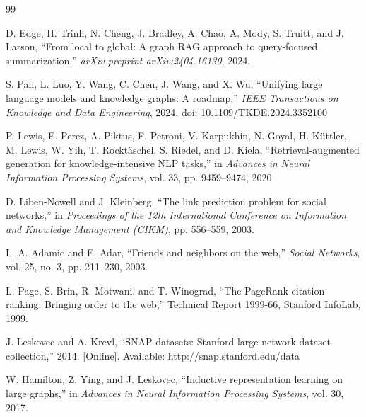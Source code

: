 \documentclass[10pt]{article}
\begin{document}
\newpage
\renewcommand{\refname}{References}

\makeatletter
\renewcommand\@biblabel[1]{}
\makeatother

\begin{thebibliography}{99}

\hangindent=36pt 
D. Edge, H. Trinh, N. Cheng, J. Bradley, A. Chao, A. Mody, S. Truitt, and J. Larson, ``From local to global: A graph RAG approach to query-focused summarization,'' \textit{arXiv preprint arXiv:2404.16130}, 2024.

\hangindent=36pt 
S. Pan, L. Luo, Y. Wang, C. Chen, J. Wang, and X. Wu, ``Unifying large language models and knowledge graphs: A roadmap,'' \textit{IEEE Transactions on Knowledge and Data Engineering}, 2024. doi: 10.1109/TKDE.2024.3352100

\hangindent=36pt 
P. Lewis, E. Perez, A. Piktus, F. Petroni, V. Karpukhin, N. Goyal, H. K\"{u}ttler, M. Lewis, W. Yih, T. Rockt\"{a}schel, S. Riedel, and D. Kiela, ``Retrieval-augmented generation for knowledge-intensive NLP tasks,'' in \textit{Advances in Neural Information Processing Systems}, vol. 33, pp. 9459--9474, 2020.

\hangindent=36pt 
D. Liben-Nowell and J. Kleinberg, ``The link prediction problem for social networks,'' in \textit{Proceedings of the 12th International Conference on Information and Knowledge Management (CIKM)}, pp. 556--559, 2003.

\hangindent=36pt 
L. A. Adamic and E. Adar, ``Friends and neighbors on the web,'' \textit{Social Networks}, vol. 25, no. 3, pp. 211--230, 2003.

\hangindent=36pt 
L. Page, S. Brin, R. Motwani, and T. Winograd, ``The PageRank citation ranking: Bringing order to the web,'' Technical Report 1999-66, Stanford InfoLab, 1999.

\hangindent=36pt 
J. Leskovec and A. Krevl, ``{SNAP} datasets: {Stanford} large network dataset collection,'' 2014. [Online]. Available: http://snap.stanford.edu/data

\hangindent=36pt 
W. Hamilton, Z. Ying, and J. Leskovec, ``Inductive representation learning on large graphs,'' in \textit{Advances in Neural Information Processing Systems}, vol. 30, 2017.

\end{thebibliography}
\end{document}
